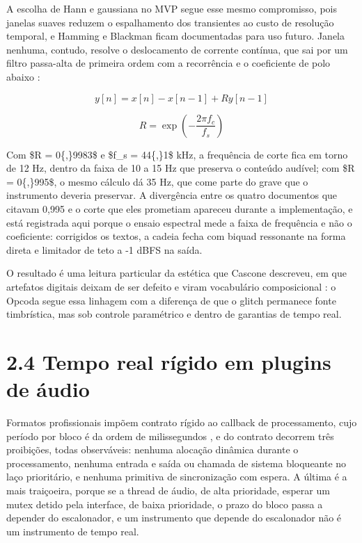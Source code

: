 \documentclass[11pt,a4paper]{article}
\begin{document}
A escolha de Hann e gaussiana no MVP segue esse mesmo compromisso, pois janelas suaves reduzem o espalhamento dos transientes ao custo de resolução temporal, e Hamming e Blackman \cite{smith2007} ficam documentadas para uso futuro. Janela nenhuma, contudo, resolve o deslocamento de corrente contínua, que sai por um filtro passa-alta de primeira ordem com a recorrência e o coeficiente de polo abaixo \cite{smith2007}:


\begin{equation}
y[n] = x[n] - x[n-1] + R y[n-1]
\label{eq:dcblocker}
\end{equation}

\begin{equation}
R = \exp\left(-\frac{2 \pi f_c}{f_s}\right)
\label{eq:rcoef}
\end{equation}

Com \$R = 0\{,\}9983\$ e \$f\_s = 44\{,\}1\$ kHz, a frequência de corte fica em torno de 12 Hz, dentro da faixa de 10 a 15 Hz que preserva o conteúdo audível; com \$R = 0\{,\}995\$, o mesmo cálculo dá 35 Hz, que come parte do grave que o instrumento deveria preservar. A divergência entre os quatro documentos que citavam 0,995 e o corte que eles prometiam apareceu durante a implementação, e está registrada aqui porque o ensaio espectral mede a faixa de frequência e não o coeficiente: corrigidos os textos, a cadeia fecha com biquad ressonante na forma direta \cite{zolzer2011} e limitador de teto a -1 dBFS na saída.


O resultado é uma leitura particular da estética que Cascone descreveu, em que artefatos digitais deixam de ser defeito e viram vocabulário composicional \cite{cascone2000}: o Opcoda segue essa linhagem com a diferença de que o glitch permanece fonte timbrística, mas sob controle paramétrico e dentro de garantias de tempo real.


\section*{2.4 Tempo real rígido em plugins de áudio}

Formatos profissionais impõem contrato rígido ao callback de processamento, cujo período por bloco é da ordem de milissegundos \cite{steinbergvst3, clap2024, pirkle2019}, e do contrato decorrem três proibições, todas observáveis: nenhuma alocação dinâmica durante o processamento, nenhuma entrada e saída ou chamada de sistema bloqueante no laço prioritário, e nenhuma primitiva de sincronização com espera. A última é a mais traiçoeira, porque se a thread de áudio, de alta prioridade, esperar um mutex detido pela interface, de baixa prioridade, o prazo do bloco passa a depender do escalonador, e um instrumento que depende do escalonador não é um instrumento de tempo real.
\end{document}
